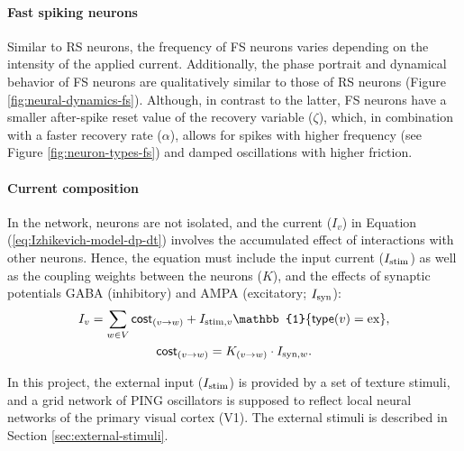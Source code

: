 \paragraph{Fast spiking neurons}

Similar to RS neurons, the frequency of FS neurons varies depending on the intensity of the applied current. Additionally, the phase portrait and dynamical behavior of FS neurons are qualitatively similar to those of RS neurons (Figure \ref{fig:neural-dynamics-fs}). Although, in contrast to the latter, FS neurons have a smaller after-spike reset value of the recovery variable ($\zeta$), which, in combination with a faster recovery rate ($\alpha$), allows for spikes with higher frequency (see Figure \ref{fig:neuron-types-fs}) and damped oscillations with higher friction.


\paragraph{Current composition}

In the network, neurons are not isolated, and the current ($I_v$) in Equation (\ref{eq:Izhikevich-model-dp-dt}) involves the accumulated effect of interactions with other neurons. Hence, the equation must include the input current ($I_{\mathrm{stim}}$) as well as the coupling weights between the neurons ($K$), and the effects of synaptic potentials GABA (inhibitory) and AMPA (excitatory; $I_{\mathrm{syn}}$):
\begin{gather}
    I_v = 
    \sum_{w \in V} \cost_{(v \to w)} + I_{\stim, v} \mathbb{1} \{ \type(v) = \ex \},  \label{eq:current-components} \\
    \cost_{(v \to w)} = K_{(v \to w)} \cdot I_{\syn, w}. 
    \label{eq:cost-function}
\end{gather}

In this project, the external input ($I_{\mathrm{stim}}$) is provided by a set of texture stimuli, and a grid network of PING oscillators is supposed to reflect local neural networks of the primary visual cortex (V1). The external stimuli is described in Section \ref{sec:external-stimuli}.


